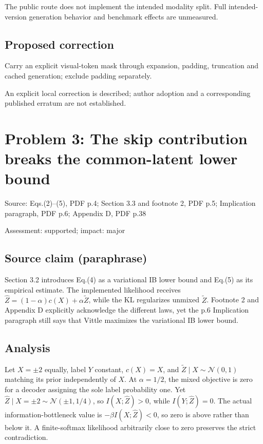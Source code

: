 \documentclass[11pt]{article}
\begin{document}
The public route does not implement the intended modality split. Full intended-version generation behavior and benchmark effects are unmeasured.

\subsection*{Proposed correction}

Carry an explicit visual-token mask through expansion, padding, truncation and cached generation; exclude padding separately.

An explicit local correction is described; author adoption and a corresponding published erratum are not established.

\section*{Problem 3: The skip contribution breaks the common-latent lower bound}

Source: Eqs.(2)–(5), PDF p.4; Section 3.3 and footnote 2, PDF p.5; Implication paragraph, PDF p.6; Appendix D, PDF p.38

Assessment: supported; impact: major

\subsection*{Source claim (paraphrase)}

Section 3.2 introduces Eq.(4) as a variational IB lower bound and Eq.(5) as its empirical estimate. The implemented likelihood receives \(\hat Z=(1-\alpha)c(X)+\alpha\tilde Z\), while the KL regularizes unmixed \(\tilde Z\). Footnote 2 and Appendix D explicitly acknowledge the different laws, yet the p.6 Implication paragraph still says that Vittle maximizes the variational IB lower bound.

\subsection*{Analysis}

Let \(X=\pm2\) equally, label \(Y\) constant, \(c(X)=X\), and \(\tilde Z\mid X\sim\mathcal N(0,1)\) matching its prior independently of \(X\). At \(\alpha=1/2\), the mixed objective is zero for a decoder assigning the sole label probability one. Yet \(\hat Z\mid X=\pm2\sim\mathcal N(\pm1,1/4)\), so \(I(X;\hat Z)>0\), while \(I(Y;\hat Z)=0\). The actual information-bottleneck value is \(-\beta I(X;\hat Z)<0\), so zero is above rather than below it. A finite-softmax likelihood arbitrarily close to zero preserves the strict contradiction.
\end{document}
